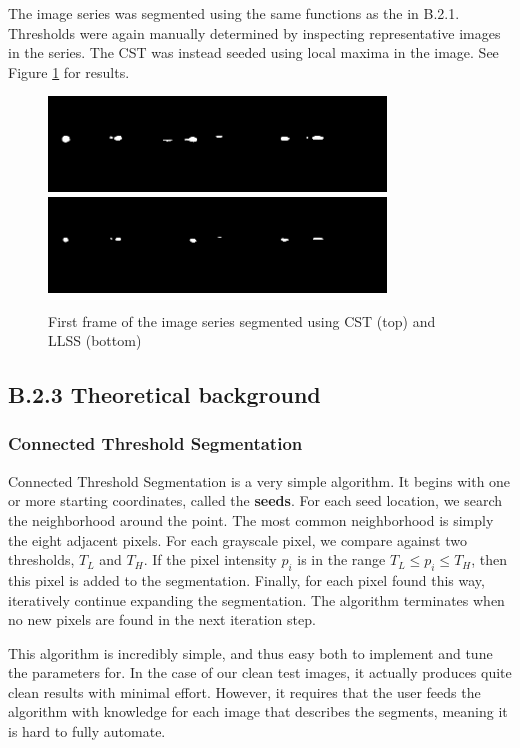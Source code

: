 \documentclass{article}
\begin{document}
The image series was segmented using the same functions as the in B.2.1. Thresholds were again manually determined by inspecting representative images in the series. The CST was instead seeded using local maxima in the image. See Figure \ref{fig:b21_imageseries} for results.

\begin{figure}
\centering
\includegraphics[width=0.8\textwidth]{figures/MitoGFP_LgtGal4_a01r01s02001_sct.png}
\includegraphics[width=0.8\textwidth]{figures/MitoGFP_LgtGal4_a01r01s02001_slls.png}
\caption{First frame of the image series segmented using CST (top) and LLSS (bottom)}
\label{fig:b21_imageseries}
\end{figure}


\subsection*{B.2.3 Theoretical background}

\subsubsection*{Connected Threshold Segmentation}
Connected Threshold Segmentation is a very simple algorithm. It begins with one or more starting coordinates, called the {\bf seeds}. For each seed location, we search the neighborhood around the point. The most common neighborhood is simply the eight adjacent pixels. For each grayscale pixel, we compare against two thresholds, $T_L$ and $T_H$. If the pixel intensity $p_i$ is in the range $T_L \leq p_i \leq T_H$, then this pixel is added to the segmentation. Finally, for each pixel found this way, iteratively continue expanding the segmentation. The algorithm terminates when no new pixels are found in the next iteration step.\cite{svi}

This algorithm is incredibly simple, and thus easy both to implement and tune the parameters for. In the case of our clean test images, it actually produces quite clean results with minimal effort. However, it requires that the user feeds the algorithm with knowledge for each image that describes the segments, meaning it is hard to fully automate.
\end{document}
